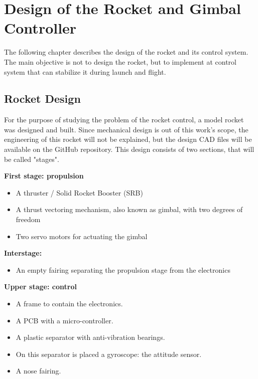 
\chapter{Design of the Rocket and Gimbal Controller}
The following chapter describes the design of the rocket and its control system. The main objective is not to design the rocket, but to implement at control system that can stabilize it during launch and flight. 

\section{Rocket Design}
For the purpose of studying the problem of the rocket control, a model rocket was designed and built. Since mechanical design is out of this work's scope, the engineering of this rocket will not be explained, but the design CAD files will be available on the GitHub repository.
This design consists of two sections, that will be called "stages".


\textbf{First stage: propulsion}
\begin{itemize}[noitemsep]
	\item {A thruster / Solid Rocket Booster (SRB)}
	\item {A thrust vectoring mechanism, also known as gimbal, with two degrees of freedom}
	\item {Two servo motors for actuating the gimbal}
\end{itemize}

\textbf{Interstage:}
\begin{itemize}[noitemsep]
	\item {An empty fairing separating the propulsion stage from the electronics}
\end{itemize}
\textbf{Upper stage: control}
\begin{itemize}[noitemsep]
	\item A frame to contain the electronics.
	\item A PCB with a micro-controller.
	\item A plastic separator with anti-vibration bearings.
	\item On this separator is placed a gyroscope: the attitude sensor.
	\item A nose fairing.
\end{itemize}

